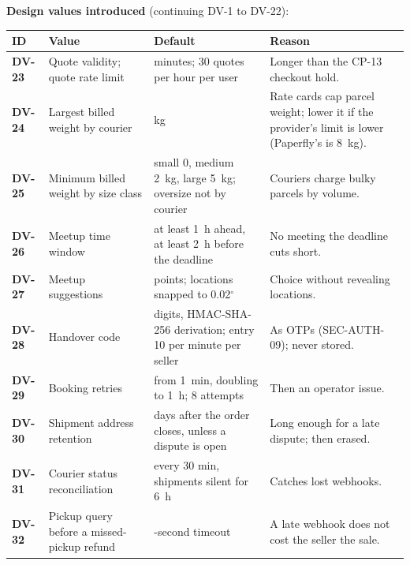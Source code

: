 \documentclass[11pt,a4paper]{article}
\newenvironment{dtable}[1]{\small\begin{longtable}{#1}}{\end{longtable}}
\begin{document}
\textbf{Design values introduced} (continuing DV-1 to DV-22):
\begin{dtable}{@{}>{\bfseries}p{1.3cm}>{\raggedright\arraybackslash}p{5.0cm}>{\raggedright\arraybackslash}p{3.6cm}>{\raggedright\arraybackslash}p{5.0cm}@{}}
\toprule
\textnormal{\textbf{ID}} & \textbf{Value} & \textbf{Default} & \textbf{Reason} \\ \midrule \endhead
DV-23 & Quote validity; quote rate limit & 30 minutes; 30 quotes per hour per user & Longer than the CP-13 checkout hold. \\
DV-24 & Largest billed weight by courier & 10 kg & Rate cards cap parcel weight; lower it if the provider's limit is lower (Paperfly's is 8~kg). \\
DV-25 & Minimum billed weight by size class & small 0, medium 2~kg, large 5~kg; oversize not by courier & Couriers charge bulky parcels by volume. \\
DV-26 & Meetup time window & at least 1~h ahead, at least 2~h before the deadline & No meeting the deadline cuts short. \\
DV-27 & Meetup suggestions & 3 points; locations snapped to 0.02$^\circ$ & Choice without revealing locations. \\
DV-28 & Handover code & 6 digits, HMAC-SHA-256 derivation; entry 10 per minute per seller & As OTPs (SEC-AUTH-09); never stored. \\
DV-29 & Booking retries & from 1~min, doubling to 1~h; 8 attempts & Then an operator issue. \\
DV-30 & Shipment address retention & 30 days after the order closes, unless a dispute is open & Long enough for a late dispute; then erased. \\
DV-31 & Courier status reconciliation & every 30 min, shipments silent for 6~h & Catches lost webhooks. \\
DV-32 & Pickup query before a missed-pickup refund & 10-second timeout & A late webhook does not cost the seller the sale. \\
\bottomrule
\end{dtable}
\end{document}
